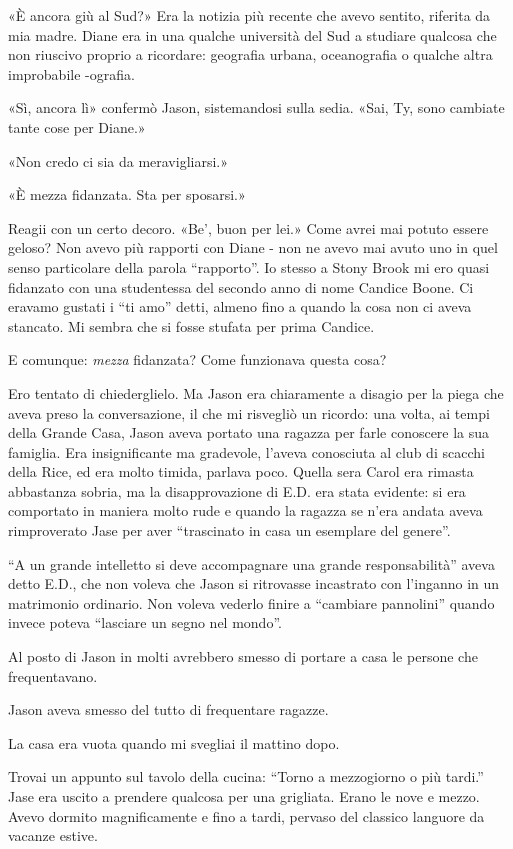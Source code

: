 «È ancora giù al Sud?» Era la notizia più recente che avevo sentito,
riferita da mia madre. Diane era in una qualche università del Sud a
studiare qualcosa che non riuscivo proprio a ricordare: geografia
urbana, oceanografia o qualche altra improbabile -ografia.

«Sì, ancora lì» confermò Jason, sistemandosi sulla sedia. «Sai, Ty, sono
cambiate tante cose per Diane.»

«Non credo ci sia da meravigliarsi.»

«È mezza fidanzata. Sta per sposarsi.»

Reagii con un certo decoro. «Be', buon per lei.» Come avrei mai potuto
essere geloso? Non avevo più rapporti con Diane - non ne avevo mai avuto
uno in quel senso particolare della parola ``rapporto''. Io stesso a
Stony Brook mi ero quasi fidanzato con una studentessa del secondo anno
di nome Candice Boone. Ci eravamo gustati i ``ti amo'' detti, almeno
fino a quando la cosa non ci aveva stancato. Mi sembra che si fosse
stufata per prima Candice.

E comunque: \emph{mezza} fidanzata? Come funzionava questa cosa?

Ero tentato di chiederglielo. Ma Jason era chiaramente a disagio per la
piega che aveva preso la conversazione, il che mi risvegliò un ricordo:
una volta, ai tempi della Grande Casa, Jason aveva portato una ragazza
per farle conoscere la sua famiglia. Era insignificante ma gradevole,
l'aveva conosciuta al club di scacchi della Rice, ed era molto timida,
parlava poco. Quella sera Carol era rimasta abbastanza sobria, ma la
disapprovazione di E.D. era stata evidente: si era comportato in maniera
molto rude e quando la ragazza se n'era andata aveva rimproverato Jase
per aver ``trascinato in casa un esemplare del genere''.

``A un grande intelletto si deve accompagnare una grande
responsabilità'' aveva detto E.D., che non voleva che Jason si
ritrovasse incastrato con l'inganno in un matrimonio ordinario. Non
voleva vederlo finire a ``cambiare pannolini'' quando invece poteva
``lasciare un segno nel mondo''.

Al posto di Jason in molti avrebbero smesso di portare a casa le persone
che frequentavano.

Jason aveva smesso del tutto di frequentare ragazze.

\separatorefiori

La casa era vuota quando mi svegliai il mattino dopo.

Trovai un appunto sul tavolo della cucina: ``Torno a mezzogiorno o più
tardi.'' Jase era uscito a prendere qualcosa per una grigliata. Erano le
nove e mezzo. Avevo dormito magnificamente e fino a tardi, pervaso del
classico languore da vacanze estive.

